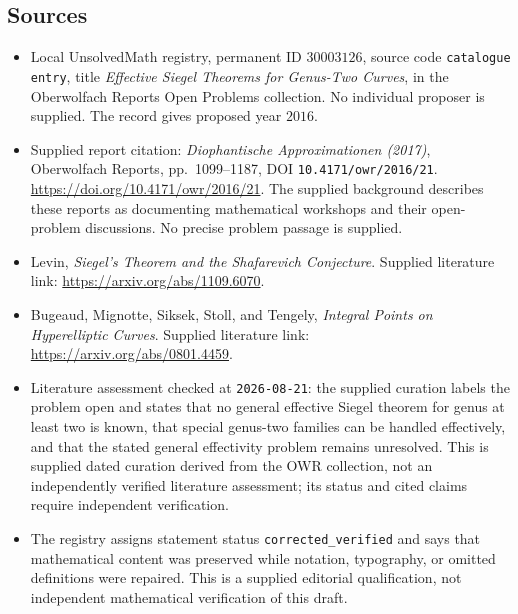 \documentclass[11pt]{article}
\begin{document}
\subsection{Sources}
\begin{itemize}
\item Local UnsolvedMath registry, permanent ID \(30003126\), source code \texttt{catalogue entry}, title \emph{Effective Siegel Theorems for Genus-Two Curves}, in the Oberwolfach Reports Open Problems collection. No individual proposer is supplied. The record gives proposed year \(2016\).
\item Supplied report citation: \emph{Diophantische Approximationen (2017)}, Oberwolfach Reports, pp.\ 1099--1187, DOI \texttt{10.4171/owr/2016/21}. \url{https://doi.org/10.4171/owr/2016/21}. The supplied background describes these reports as documenting mathematical workshops and their open-problem discussions. No precise problem passage is supplied.
\item Levin, \emph{Siegel's Theorem and the Shafarevich Conjecture}. Supplied literature link: \url{https://arxiv.org/abs/1109.6070}.
\item Bugeaud, Mignotte, Siksek, Stoll, and Tengely, \emph{Integral Points on Hyperelliptic Curves}. Supplied literature link: \url{https://arxiv.org/abs/0801.4459}.
\item Literature assessment checked at \texttt{2026-08-21}: the supplied curation labels the problem open and states that no general effective Siegel theorem for genus at least two is known, that special genus-two families can be handled effectively, and that the stated general effectivity problem remains unresolved. This is supplied dated curation derived from the OWR collection, not an independently verified literature assessment; its status and cited claims require independent verification.
\item The registry assigns statement status \texttt{corrected\_verified} and says that mathematical content was preserved while notation, typography, or omitted definitions were repaired. This is a supplied editorial qualification, not independent mathematical verification of this draft.
\end{itemize}
\end{document}
